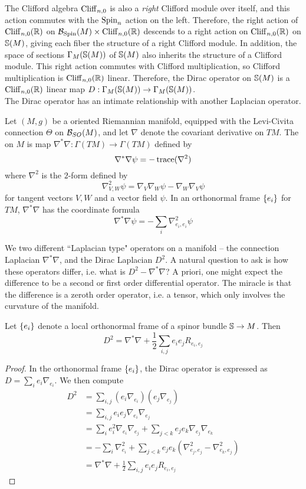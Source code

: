 The Clifford algebra $\Cliff_{n,0}$ is also a \emph{right} Clifford module over
itself, and this action commutes with the $\Spin_n$ action on the left. Therefore,
the right action of $\Cliff_{n,0}(\R)$ on $\B_{\Spin}(M) \times \Cliff_{n,0}(\R)$
descends to a right action on $\Cliff_{n,0}(\R)$ on $\S(M)$, giving each fiber
the structure of a right Clifford module. In addition, the space of sections
$\Gamma_M(\S(M))$ of $\S(M)$ also inherits the structure of a Clifford module.
This right action commutes with Clifford  multiplication, so Clifford multiplication is
$\Cliff_{n,0}(\R)$ linear. Therefore, the Dirac operator on $\S(M)$ is a
$\Cliff_{n,0}(\R)$ linear map $D : \Gamma_M(\S(M)) \to \Gamma_M(\S(M))$. \\

The Dirac operator has an intimate relationship with another Laplacian operator.
\begin{defn}
Let $(M,g)$ be a oriented Riemannian manifold, equipped with the Levi-Civita connection
$\Theta$ on $\B_{SO}(M)$, and let $\nabla$ denote the covariant derivative on $TM$.
The  on $M$ is map $\nabla^*\nabla : \Gamma(TM) \to \Gamma(TM)$
defined by
\[
\nabla^*\nabla\psi = -\trace(\nabla^2)
\]
where $\nabla^2$ is the $2$-form defined by
\[
\nabla^2_{V,W}\psi = \nabla_V\nabla_W\psi - \nabla_W\nabla_V\psi
\]
for tangent vectors $V,W$ and a vector field $\psi$. In an orthonormal frame $\set{e_i}$
for $TM$, $\nabla^*\nabla$ has the coordinate formula
\[
\nabla^*\nabla\psi = -\sum_i \nabla^2_{e_i, e_i}\psi
\]
\end{defn}
%
We two different ``Laplacian type" operators on a manifold -- the connection
Laplacian $\nabla^*\nabla$, and the Dirac Laplacian $D^2$. A natural question
to ask is how these operators differ, i.e. what is $D^2 - \nabla^*\nabla$? A priori,
one might expect the difference to be a second or first order differential operator.
The miracle is that the difference is a zeroth order operator, i.e. a tensor, which
only involves the curvature of the manifold.
%
\begin{thm}
Let $\set{e_i}$ denote a local orthonormal frame of a spinor bundle $\S \to M$. Then
\[
D^2 = \nabla^*\nabla + \frac{1}{2}\sum_{i, j} e_i e_j R_{e_i, e_j}
\]
\end{thm}
%
\begin{proof} %
In the orthonormal frame $\set{e_i}$, the Dirac operator is expressed as
$D = \sum_i e_i\nabla_{e_i}$. We then compute
\begin{align*}
D^2 &= \sum_{i,j}(e_i\nabla_{e_i})(e_j\nabla_{e_j}) \\
&= \sum_{i,j} e_ie_j\nabla_{e_i}\nabla_{e_j} \\
&= \sum_i e_i^2\nabla_{e_i}\nabla_{e_j} + \sum_{j < k} e_j e_k\nabla_{e_j}\nabla_{e_k} \\
&= -\sum_i \nabla^2_{e_i}
+ \sum_{j < k} e_je_k (\nabla^2_{e_j, e_j} - \nabla^2_{e_k, e_j}) \\
&= \nabla^*\nabla + \frac{1}{2}\sum_{i, j} e_i e_j R_{e_i, e_j}
\end{align*}
\end{proof}
